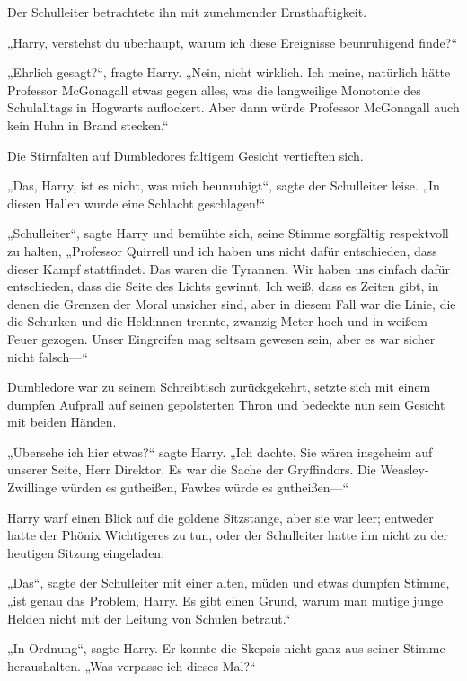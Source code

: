 {Der Schulleiter betrachtete ihn mit zunehmender Ernsthaftigkeit.

„Harry, verstehst du überhaupt, warum ich diese Ereignisse beunruhigend finde?“

„Ehrlich gesagt?“, fragte Harry. „Nein, nicht wirklich. Ich meine, natürlich hätte Professor McGonagall etwas gegen alles, was die langweilige Monotonie des Schulalltags in Hogwarts auflockert. Aber dann würde Professor McGonagall auch kein Huhn in Brand stecken.“

Die Stirnfalten auf Dumbledores faltigem Gesicht vertieften sich.

„Das, Harry, ist es nicht, was mich beunruhigt“, sagte der Schulleiter leise. „In diesen Hallen wurde eine Schlacht geschlagen!“

„Schulleiter“, sagte Harry und bemühte sich, seine Stimme sorgfältig respektvoll zu halten, „Professor Quirrell und ich haben uns nicht dafür entschieden, dass dieser Kampf stattfindet. Das waren die Tyrannen. Wir haben uns einfach dafür entschieden, dass die Seite des Lichts gewinnt. Ich weiß, dass es Zeiten gibt, in denen die Grenzen der Moral unsicher sind, aber in diesem Fall war die Linie, die die Schurken und die Heldinnen trennte, zwanzig Meter hoch und in weißem Feuer gezogen. Unser Eingreifen mag seltsam gewesen sein, aber es war sicher nicht falsch—“

Dumbledore war zu seinem Schreibtisch zurückgekehrt, setzte sich mit einem dumpfen Aufprall auf seinen gepolsterten Thron und bedeckte nun sein Gesicht mit beiden Händen.

„Übersehe ich hier etwas?“ sagte Harry. „Ich dachte, Sie wären insgeheim auf unserer Seite, Herr Direktor. Es war die Sache der Gryffindors. Die Weasley-Zwillinge würden es gutheißen, Fawkes würde es gutheißen—“

Harry warf einen Blick auf die goldene Sitzstange, aber sie war leer; entweder hatte der Phönix Wichtigeres zu tun, oder der Schulleiter hatte ihn nicht zu der heutigen Sitzung eingeladen.

„Das“, sagte der Schulleiter mit einer alten, müden und etwas dumpfen Stimme, „ist genau das Problem, Harry. Es gibt einen Grund, warum man mutige junge Helden nicht mit der Leitung von Schulen betraut.“

„In Ordnung“, sagte Harry. Er konnte die Skepsis nicht ganz aus seiner Stimme heraushalten. „Was verpasse ich dieses Mal?“

}
